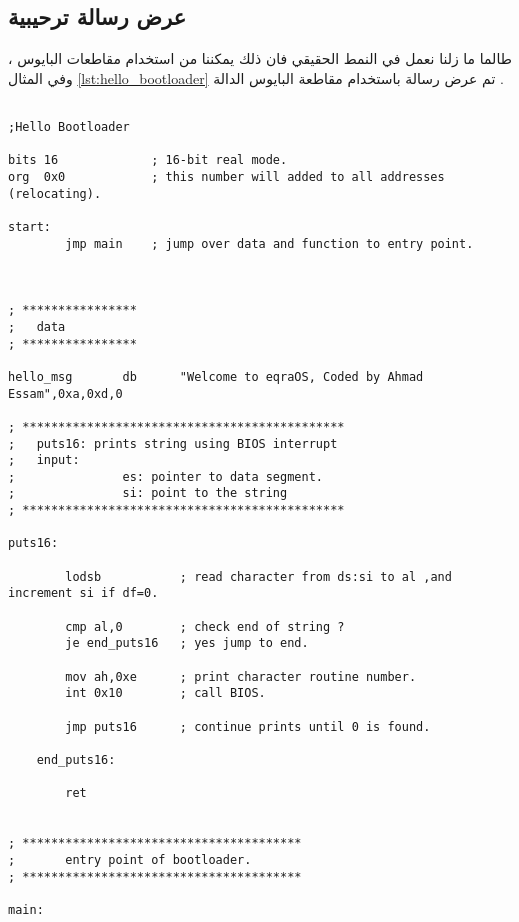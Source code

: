 \documentclass[document.tex]{subfiles}
\begin{document}
\subsection{عرض رسالة ترحيبية}
طالما ما زلنا نعمل في النمط الحقيقي فان ذلك يمكننا من استخدام مقاطعات البايوس ، وفي المثال \ref{lst:hello_bootloader} تم  عرض رسالة باستخدام مقاطعة البايوس  الدالة  . 


\begin{english}

\lstset{numberstyle=\tiny,numbers=left,stepnumber=1,numbersep=5pt,tabsize=2,extendedchars=true,breaklines=true,frame=b,showspaces=false, showtabs=false,xleftmargin=10pt,framexleftmargin=10pt,framexrightmargin=5pt,framexbottommargin=4pt,showstringspaces=false,language=[x86masm]Assembler}

\begin{lstlisting}[label=lst:hello_bootloader,caption=\en{Welcom to OS World}]

;Hello Bootloader

bits 16				; 16-bit real mode.
org	 0x0			; this number will added to all addresses (relocating).

start:
		jmp main	; jump over data and function to entry point.


		
; ****************
;	data
; ****************

hello_msg		db		"Welcome to eqraOS, Coded by Ahmad Essam",0xa,0xd,0

; *********************************************
;	puts16: prints string using BIOS interrupt
;   input:
;				es: pointer to data segment.
;				si: point to the string
; *********************************************

puts16:
		
		lodsb			; read character from ds:si to al ,and increment si if df=0.
		
		cmp al,0		; check end of string ?
		je end_puts16	; yes jump to end.
		
		mov ah,0xe		; print character routine number.
		int 0x10		; call BIOS.
		
		jmp puts16		; continue prints until 0 is found.
		
	end_puts16:
	
		ret				
		
		
; ***************************************
;		entry point of bootloader.
; ***************************************
		
main:				


\end{lstlisting}
\end{english}
\end{document}
